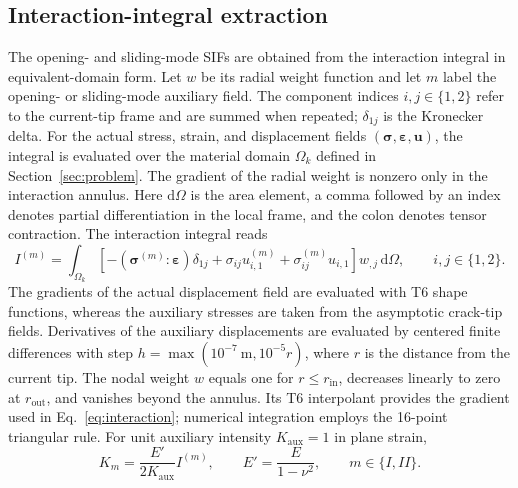 \documentclass[11pt]{article}
\newcommand{\dd}{\mathrm{d}}
\begin{document}
\subsection{Interaction-integral extraction}
The opening- and sliding-mode SIFs are obtained from the
interaction integral in equivalent-domain form. Let $w$ be its
radial weight function and let $m$ label the opening- or sliding-mode
auxiliary field. The component indices $i,j\in\{1,2\}$ refer
to the current-tip frame and are summed when repeated;
$\delta_{1j}$ is the Kronecker delta. For the actual stress,
strain, and displacement fields
$(\bm\sigma,\bm\varepsilon,\bm u)$, the integral is evaluated over
the material domain $\Omega_k$ defined in Section~\ref{sec:problem}.
The gradient of the radial weight is nonzero only in the interaction
annulus. Here $\dd\Omega$ is the area element,
a comma followed by an index denotes partial differentiation in the
local frame, and the colon denotes tensor contraction. The interaction
integral reads
\begin{equation}
 I^{(m)}=\int_{\Omega_k}
 \left[-(\bm\sigma^{(m)}\!:\bm\varepsilon)\delta_{1j}
 +\sigma_{ij}u^{(m)}_{i,1}
 +\sigma^{(m)}_{ij}u_{i,1}\right]w_{,j}\,\dd\Omega,
 \qquad i,j\in\{1,2\}.\label{eq:interaction}
\end{equation}
The gradients of the actual displacement field are evaluated with
T6 shape functions, whereas the auxiliary stresses are taken from
the asymptotic crack-tip fields. Derivatives of the auxiliary
displacements are evaluated by centered finite differences with
step $h=\max(10^{-7}\ \mathrm m,10^{-5}r)$, where $r$ is the
distance from the current tip. The nodal weight $w$ equals one for
$r\leq r_{\mathrm{in}}$, decreases linearly to zero at
$r_{\mathrm{out}}$, and vanishes beyond the annulus.
Its T6 interpolant provides the gradient used in
Eq.~\eqref{eq:interaction}; numerical integration employs the
16-point triangular rule. For unit auxiliary intensity
$K_{\mathrm{aux}}=1$ in plane strain,
\begin{equation}
 K_m=\frac{E'}{2K_{\mathrm{aux}}}I^{(m)},\qquad
 E'=\frac{E}{1-\nu^2},\qquad m\in\{I,II\}.\label{eq:normalization}
\end{equation}
\end{document}
